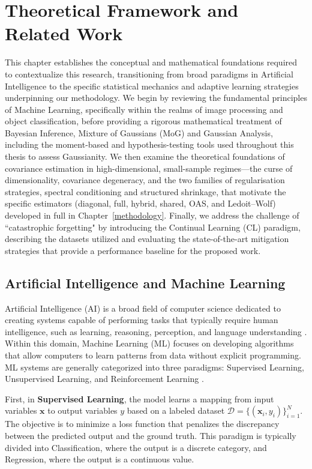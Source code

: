 \chapter{Theoretical Framework and Related Work}
\label{ch:framework}

This chapter establishes the conceptual and mathematical foundations required to contextualize this research, transitioning from broad paradigms in Artificial Intelligence to the specific statistical mechanics and adaptive learning strategies underpinning our methodology. We begin by reviewing the fundamental principles of Machine Learning, specifically within the realms of image processing and object classification, before providing a rigorous mathematical treatment of Bayesian Inference, Mixture of Gaussians (MoG) and Gaussian Analysis, including the moment-based and hypothesis-testing tools used throughout this thesis to assess Gaussianity. We then examine the theoretical foundations of covariance estimation in high-dimensional, small-sample regimes---the curse of dimensionality, covariance degeneracy, and the two families of regularisation strategies, spectral conditioning and structured shrinkage, that motivate the specific estimators (diagonal, full, hybrid, shared, OAS, and Ledoit--Wolf) developed in full in Chapter~\ref{methodology}. Finally, we address the challenge of ``catastrophic forgetting" by introducing the Continual Learning (CL) paradigm, describing the datasets utilized and evaluating the state-of-the-art mitigation strategies that provide a performance baseline for the proposed work.

\section{Artificial Intelligence and Machine Learning}

Artificial Intelligence (AI) is a broad field of computer science dedicated to creating systems capable of performing tasks that typically require human intelligence, such as learning, reasoning, perception, and language understanding \cite{RussellNorvig}. Within this domain, Machine Learning (ML) focuses on developing algorithms that allow computers to learn patterns from data without explicit programming. ML systems are generally categorized into three paradigms: Supervised Learning, Unsupervised Learning, and Reinforcement Learning \cite{Bishop2006}.

First, in \textbf{Supervised Learning}, the model learns a mapping from input variables $\mathbf{x}$ to output variables $y$ based on a labeled dataset $\mathcal{D} = \{(\mathbf{x}_i, y_i)\}_{i=1}^N$. The objective is to minimize a loss function that penalizes the discrepancy between the predicted output and the ground truth. This paradigm is typically divided into Classification, where the output is a discrete category, and Regression, where the output is a continuous value.

